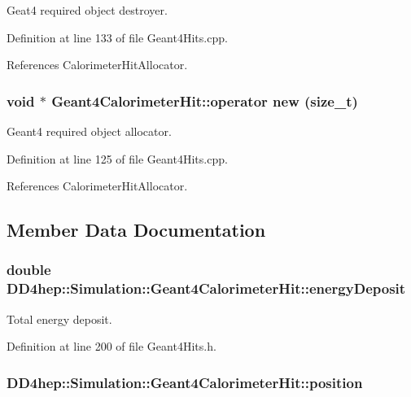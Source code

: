Geat4 required object destroyer. 

Definition at line 133 of file Geant4Hits.cpp.

References CalorimeterHitAllocator.\hypertarget{class_d_d4hep_1_1_simulation_1_1_geant4_calorimeter_hit_a2f0811576b3d642d15805d87a096f598}{
\subsubsection[{operator new}]{\setlength{\rightskip}{0pt plus 5cm}void $\ast$ Geant4CalorimeterHit::operator new (size\_\-t)}}
\label{class_d_d4hep_1_1_simulation_1_1_geant4_calorimeter_hit_a2f0811576b3d642d15805d87a096f598}


Geant4 required object allocator. 

Definition at line 125 of file Geant4Hits.cpp.

References CalorimeterHitAllocator.

\subsection{Member Data Documentation}
\hypertarget{class_d_d4hep_1_1_simulation_1_1_geant4_calorimeter_hit_ae597e191f120cea7585fec73ddae48e9}{
\subsubsection[{energyDeposit}]{\setlength{\rightskip}{0pt plus 5cm}double {\bf DD4hep::Simulation::Geant4CalorimeterHit::energyDeposit}}}
\label{class_d_d4hep_1_1_simulation_1_1_geant4_calorimeter_hit_ae597e191f120cea7585fec73ddae48e9}


Total energy deposit. 

Definition at line 200 of file Geant4Hits.h.\hypertarget{class_d_d4hep_1_1_simulation_1_1_geant4_calorimeter_hit_a1e8c2c552a126d33cca2fbf15354309f}{
\subsubsection[{position}]{ {\bf DD4hep::Simulation::Geant4CalorimeterHit::position}}}
\label{class_d_d4hep_1_1_simulation_1_1_geant4_calorimeter_hit_a1e8c2c552a126d33cca2fbf15354309f}


